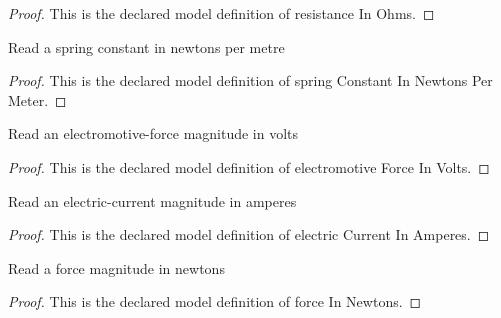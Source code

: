 \begin{proof}
  This is the declared model definition of resistance In Ohms.
\end{proof}
\begin{definition}
  \label{def:physics:phyx-mini-0979:phyxminiproblems-problemphyxmini0979-springconstantinnewtonspermeter}
  Read a spring constant in newtons per metre
\end{definition}
\begin{proof}
  This is the declared model definition of spring Constant In Newtons Per Meter.
\end{proof}
\begin{definition}
  \label{def:physics:phyx-mini-0979:phyxminiproblems-problemphyxmini0979-electromotiveforceinvolts}
  Read an electromotive-force magnitude in volts
\end{definition}
\begin{proof}
  This is the declared model definition of electromotive Force In Volts.
\end{proof}
\begin{definition}
  \label{def:physics:phyx-mini-0979:phyxminiproblems-problemphyxmini0979-electriccurrentinamperes}
  Read an electric-current magnitude in amperes
\end{definition}
\begin{proof}
  This is the declared model definition of electric Current In Amperes.
\end{proof}
\begin{definition}
  \label{def:physics:phyx-mini-0979:phyxminiproblems-problemphyxmini0979-forceinnewtons}
  Read a force magnitude in newtons
\end{definition}
\begin{proof}
  This is the declared model definition of force In Newtons.
\end{proof}
